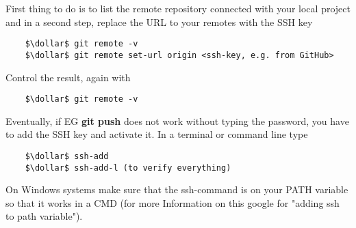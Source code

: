 

First thing to do is to list the remote repository connected with your local project and in a second step, replace the URL to your remotes 
with the SSH key

\begin{lstlisting}
	$\dollar$ git remote -v
	$\dollar$ git remote set-url origin <ssh-key, e.g. from GitHub>
\end{lstlisting}
Control the result, again with
\begin{lstlisting}
	$\dollar$ git remote -v
\end{lstlisting}
Eventually, if \ac{EG} \textbf{git push} does not work without typing the password, you have to add the SSH key and activate it. In a terminal or command line type
\begin{lstlisting}
	$\dollar$ ssh-add
	$\dollar$ ssh-add-l (to verify everything)
\end{lstlisting}
On Windows  systems make sure that the ssh-command is on your PATH variable so that it works in a CMD (for more Information on this google for "adding ssh to path variable").









